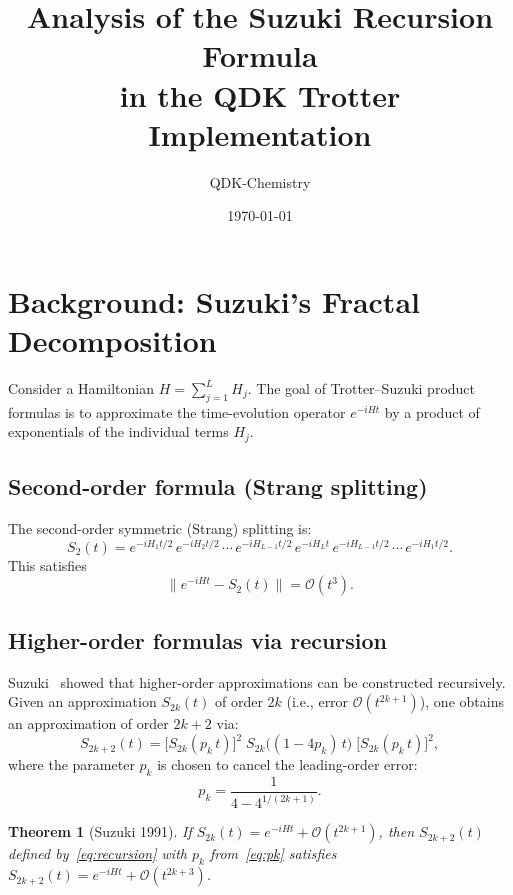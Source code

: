 \documentclass[11pt]{article}
\title{Analysis of the Suzuki Recursion Formula\\in the QDK Trotter Implementation}
\author{QDK-Chemistry}
\date{\today}
\newtheorem{theorem}{Theorem}
\begin{document}
\maketitle

\section{Background: Suzuki's Fractal Decomposition}

Consider a Hamiltonian $H = \sum_{j=1}^{L} H_j$.  The goal of Trotter--Suzuki
product formulas is to approximate the time-evolution operator $e^{-iHt}$ by a
product of exponentials of the individual terms $H_j$.

\subsection{Second-order formula (Strang splitting)}

The second-order symmetric (Strang) splitting is:
\begin{equation}\label{eq:S2}
  S_2(t) = e^{-iH_1 t/2}\, e^{-iH_2 t/2}\, \cdots\, e^{-iH_{L-1} t/2}\,
            e^{-iH_L t}\,
            e^{-iH_{L-1} t/2}\, \cdots\, e^{-iH_1 t/2}.
\end{equation}
This satisfies
\begin{equation}
  \bigl\lVert e^{-iHt} - S_2(t) \bigr\rVert = \mathcal{O}(t^3).
\end{equation}

\subsection{Higher-order formulas via recursion}

Suzuki~\cite{Suzuki1990,Suzuki1991} showed that higher-order approximations can
be constructed recursively.  Given an approximation $S_{2k}(t)$ of order $2k$
(i.e., error $\mathcal{O}(t^{2k+1})$), one obtains an approximation of order
$2k+2$ via:
\begin{equation}\label{eq:recursion}
  S_{2k+2}(t)
  = \bigl[S_{2k}(p_k\, t)\bigr]^2\;
    S_{2k}\!\bigl((1 - 4p_k)\, t\bigr)\;
    \bigl[S_{2k}(p_k\, t)\bigr]^2,
\end{equation}
where the parameter $p_k$ is chosen to cancel the leading-order error:
\begin{equation}\label{eq:pk}
  \boxed{p_k = \frac{1}{4 - 4^{1/(2k+1)}}}.
\end{equation}

\begin{theorem}[Suzuki 1991]\label{thm:suzuki}
If $S_{2k}(t) = e^{-iHt} + \mathcal{O}(t^{2k+1})$, then
$S_{2k+2}(t)$ defined by~\eqref{eq:recursion} with $p_k$ from~\eqref{eq:pk}
satisfies $S_{2k+2}(t) = e^{-iHt} + \mathcal{O}(t^{2k+3})$.
\end{theorem}
\end{document}
